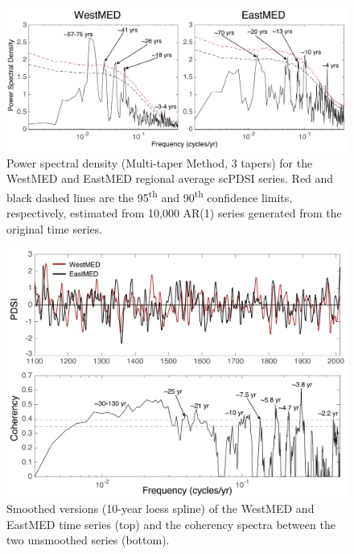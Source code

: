 \documentclass[draft,jgr]{AGUTeX}
\begin{document}
\begin{figure}
\center
\includegraphics[width=1.0\columnwidth]{fig_08_eastwest_mtm_spectra.png}
\caption{Power spectral density (Multi-taper Method, 3 tapers) for the WestMED and EastMED regional average scPDSI series. Red and black dashed lines are the 95\textsuperscript{th} and 90\textsuperscript{th} confidence limits, respectively, estimated from 10,000 AR(1) series generated from the original time series.}\label{placeholder}
\end{figure}

\begin{figure}
\center
\includegraphics[width=0.9\columnwidth]{fig_09_eastwest_cohere.png}
\caption{Smoothed versions (10-year loess spline) of the WestMED and EastMED time series (top) and the coherency spectra between the two unsmoothed series (bottom).}\label{placeholder}
\end{figure}
\end{document}
